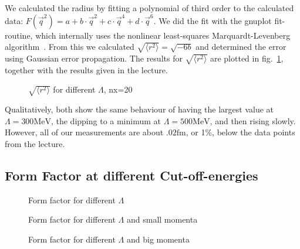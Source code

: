 \documentclass{scrartcl}
\begin{document}
We calculated the radius by fitting a polynomial of third order to the calculated data: $F(\vec{q}^2)=a+b\cdot \vec{q}^2+c\cdot\vec{q}^4+d\cdot\vec{q}^6$. We did the fit with the gnuplot fit-routine, which internally uses the nonlinear least-squares Marquardt-Levenberg algorithm~\cite[p. 74]{gnuplotdoc}. From this we calculated $\sqrt{\langle r^2\rangle}=\sqrt{-6b}$ and determined the error using Gaussian error propagation. The results for $\sqrt{\langle r^2\rangle}$ are plotted in fig.~\ref{fig:radius}, together with the results given in the lecture.

\begin{figure}[htbp]
	
	\caption{$\sqrt{\langle r^2\rangle}$ for different $\Lambda$, nx=20}
	\label{fig:radius}
\end{figure}

Qualitatively, both show the same behaviour of having the largest value at $\Lambda=300\si{\mega\electronvolt}$, the dipping to a minimum at $\Lambda=500\si{\mega\electronvolt}$, and then rising slowly. However, all of our measurements are about $.02\si{\femto\meter}$, or 1\%, below the data points from the lecture.

\subsection{Form Factor at different Cut-off-energies}

\begin{figure}[htbp]
	
	\caption{Form factor for different $\Lambda$}
	\label{fig:formfactor}
\end{figure}

\begin{figure}[htbp]
	
	\caption{Form factor for different $\Lambda$ and small momenta}
	\label{fig:formfactorsmall}
\end{figure}

\begin{figure}[htbp]
	
	\caption{Form factor for different $\Lambda$ and big momenta}
	\label{fig:formfactorbig}
\end{figure}

\newpage
\listoffigures
\listoftables
\printbibliography
\end{document}
